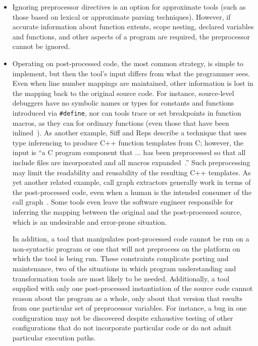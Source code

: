 \documentclass[11pt]{article}
\begin{document}
\begin{itemize}

\item Ignoring preprocessor directives is an option for approximate
tools (such as those based on lexical or approximate parsing
techniques).  However, if accurate information about function extents,
scope nesting, declared variables and functions, and other aspects of
a program are required, the preprocessor cannot be ignored.

\item Operating on post-processed code, the most common strategy, is
simple to implement, but then the tool's input differs from what the
programmer sees.  Even when line number mappings are maintained, other
information is lost in the mapping back to the original source code.
For instance, source-level debuggers have no symbolic names or types
for constants and functions introduced via {\tt \#define}, nor can
tools trace or set breakpoints in function macros, as they can for
ordinary functions (even those that have been
inlined~\cite{Zellweger83:TR}).  As another example, Siff and Reps
describe a technique that uses type inferencing to produce C++
function templates from C; however, the input is ``a C program
component that $\ldots$ has been preprocessed so that all include
files are incorporated and all macros
expanded~\cite[p.~145]{Siff-fse96}.''  Such preprocessing may limit
the readability and reusability of the resulting C++ templates.  As
yet another related example, call graph extractors generally work in
terms of the post-processed code, even when a human is the intended
consumer of the call graph~\cite{Murphy-icse18}.  Some tools even
leave the software engineer responsible for inferring the mapping
between the original and the post-processed source, which is an
undesirable and error-prone situation.

In addition, a tool that manipulates post-processed code cannot be run
on a non-syntactic program or one that will not preprocess on the
platform on which the tool is being run.  These constraints complicate
porting and maintenance, two of the situations in which program
understanding and transformation tools are most likely to be needed.
Additionally, a tool supplied with only one post-processed
instantiation of the source code cannot reason about the program as a
whole, only about that version that results from one particular set of
preprocessor variables.  For instance, a bug in one configuration may
not be discovered despite exhaustive testing of other configurations
that do not incorporate particular code or do not admit particular
execution paths.


\end{itemize}
\end{document}
